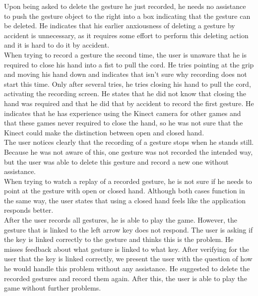 Upon being asked to delete the gesture he just recorded, he needs no assistance to push the gesture object to the right into a box indicating that the gesture can be deleted. He indicates that his earlier anxiousness of deleting a gesture by accident is unnecessary, as it requires some effort to perform this deleting action and it is hard to do it by accident.\\

When trying to record a gesture the second time, the user is unaware that he is required to close his hand into a fist to pull the cord. He tries pointing at the grip and moving his hand down and indicates that isn't sure why recording does not start this time. Only after several tries, he tries closing his hand to pull the cord, activating the recording screen. He states that he did not know that closing the hand was required and that he did that by accident to record the first gesture. He indicates that he has experience using the Kinect camera for other games and that these games never required to close the hand, so he was not sure that the Kinect could make the distinction between open and closed hand.\\

The user notices clearly that the recording of a gesture stops when he stands still. Because he was not aware of this, one gesture was not recorded the intended way, but the user was able to delete this gesture and record a new one without assistance.\\

When trying to watch a replay of a recorded gesture, he is not sure if he needs to point at the gesture with open or closed hand. Although both cases function in the same way, the user states that using a closed hand feels like the application responds better.\\

After the user records all gestures, he is able to play the game. However, the gesture that is linked to the left arrow key does not respond. The user is asking if the key is linked correctly to the gesture and thinks this is the problem. He misses feedback about what gesture is linked to what key. After verifying for the user that the key is linked correctly, we present the user with the question of how he would handle this problem without any assistance. He suggested to delete the recorded gestures and record them again. After this, the user is able to play the game without further problems.\\

